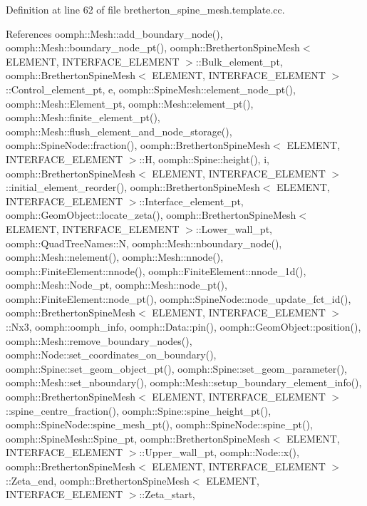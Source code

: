 Definition at line 62 of file bretherton\+\_\+spine\+\_\+mesh.\+template.\+cc.



References oomph\+::\+Mesh\+::add\+\_\+boundary\+\_\+node(), oomph\+::\+Mesh\+::boundary\+\_\+node\+\_\+pt(), oomph\+::\+Bretherton\+Spine\+Mesh$<$ E\+L\+E\+M\+E\+N\+T, I\+N\+T\+E\+R\+F\+A\+C\+E\+\_\+\+E\+L\+E\+M\+E\+N\+T $>$\+::\+Bulk\+\_\+element\+\_\+pt, oomph\+::\+Bretherton\+Spine\+Mesh$<$ E\+L\+E\+M\+E\+N\+T, I\+N\+T\+E\+R\+F\+A\+C\+E\+\_\+\+E\+L\+E\+M\+E\+N\+T $>$\+::\+Control\+\_\+element\+\_\+pt, e, oomph\+::\+Spine\+Mesh\+::element\+\_\+node\+\_\+pt(), oomph\+::\+Mesh\+::\+Element\+\_\+pt, oomph\+::\+Mesh\+::element\+\_\+pt(), oomph\+::\+Mesh\+::finite\+\_\+element\+\_\+pt(), oomph\+::\+Mesh\+::flush\+\_\+element\+\_\+and\+\_\+node\+\_\+storage(), oomph\+::\+Spine\+Node\+::fraction(), oomph\+::\+Bretherton\+Spine\+Mesh$<$ E\+L\+E\+M\+E\+N\+T, I\+N\+T\+E\+R\+F\+A\+C\+E\+\_\+\+E\+L\+E\+M\+E\+N\+T $>$\+::H, oomph\+::\+Spine\+::height(), i, oomph\+::\+Bretherton\+Spine\+Mesh$<$ E\+L\+E\+M\+E\+N\+T, I\+N\+T\+E\+R\+F\+A\+C\+E\+\_\+\+E\+L\+E\+M\+E\+N\+T $>$\+::initial\+\_\+element\+\_\+reorder(), oomph\+::\+Bretherton\+Spine\+Mesh$<$ E\+L\+E\+M\+E\+N\+T, I\+N\+T\+E\+R\+F\+A\+C\+E\+\_\+\+E\+L\+E\+M\+E\+N\+T $>$\+::\+Interface\+\_\+element\+\_\+pt, oomph\+::\+Geom\+Object\+::locate\+\_\+zeta(), oomph\+::\+Bretherton\+Spine\+Mesh$<$ E\+L\+E\+M\+E\+N\+T, I\+N\+T\+E\+R\+F\+A\+C\+E\+\_\+\+E\+L\+E\+M\+E\+N\+T $>$\+::\+Lower\+\_\+wall\+\_\+pt, oomph\+::\+Quad\+Tree\+Names\+::N, oomph\+::\+Mesh\+::nboundary\+\_\+node(), oomph\+::\+Mesh\+::nelement(), oomph\+::\+Mesh\+::nnode(), oomph\+::\+Finite\+Element\+::nnode(), oomph\+::\+Finite\+Element\+::nnode\+\_\+1d(), oomph\+::\+Mesh\+::\+Node\+\_\+pt, oomph\+::\+Mesh\+::node\+\_\+pt(), oomph\+::\+Finite\+Element\+::node\+\_\+pt(), oomph\+::\+Spine\+Node\+::node\+\_\+update\+\_\+fct\+\_\+id(), oomph\+::\+Bretherton\+Spine\+Mesh$<$ E\+L\+E\+M\+E\+N\+T, I\+N\+T\+E\+R\+F\+A\+C\+E\+\_\+\+E\+L\+E\+M\+E\+N\+T $>$\+::\+Nx3, oomph\+::oomph\+\_\+info, oomph\+::\+Data\+::pin(), oomph\+::\+Geom\+Object\+::position(), oomph\+::\+Mesh\+::remove\+\_\+boundary\+\_\+nodes(), oomph\+::\+Node\+::set\+\_\+coordinates\+\_\+on\+\_\+boundary(), oomph\+::\+Spine\+::set\+\_\+geom\+\_\+object\+\_\+pt(), oomph\+::\+Spine\+::set\+\_\+geom\+\_\+parameter(), oomph\+::\+Mesh\+::set\+\_\+nboundary(), oomph\+::\+Mesh\+::setup\+\_\+boundary\+\_\+element\+\_\+info(), oomph\+::\+Bretherton\+Spine\+Mesh$<$ E\+L\+E\+M\+E\+N\+T, I\+N\+T\+E\+R\+F\+A\+C\+E\+\_\+\+E\+L\+E\+M\+E\+N\+T $>$\+::spine\+\_\+centre\+\_\+fraction(), oomph\+::\+Spine\+::spine\+\_\+height\+\_\+pt(), oomph\+::\+Spine\+Node\+::spine\+\_\+mesh\+\_\+pt(), oomph\+::\+Spine\+Node\+::spine\+\_\+pt(), oomph\+::\+Spine\+Mesh\+::\+Spine\+\_\+pt, oomph\+::\+Bretherton\+Spine\+Mesh$<$ E\+L\+E\+M\+E\+N\+T, I\+N\+T\+E\+R\+F\+A\+C\+E\+\_\+\+E\+L\+E\+M\+E\+N\+T $>$\+::\+Upper\+\_\+wall\+\_\+pt, oomph\+::\+Node\+::x(), oomph\+::\+Bretherton\+Spine\+Mesh$<$ E\+L\+E\+M\+E\+N\+T, I\+N\+T\+E\+R\+F\+A\+C\+E\+\_\+\+E\+L\+E\+M\+E\+N\+T $>$\+::\+Zeta\+\_\+end, oomph\+::\+Bretherton\+Spine\+Mesh$<$ E\+L\+E\+M\+E\+N\+T, I\+N\+T\+E\+R\+F\+A\+C\+E\+\_\+\+E\+L\+E\+M\+E\+N\+T $>$\+::\+Zeta\+\_\+start, 